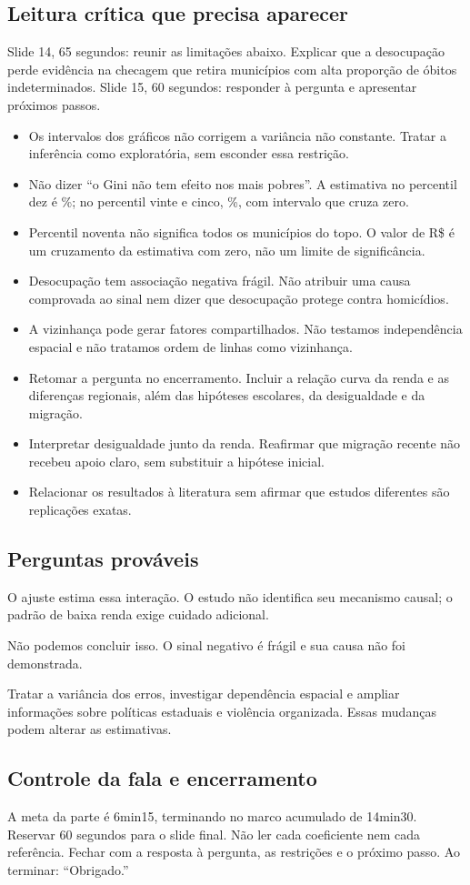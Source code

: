 \subsection{Leitura crítica que precisa aparecer}
Slide 14, 65 segundos: reunir as limitações abaixo. Explicar que a desocupação perde evidência na checagem que retira municípios com alta proporção de óbitos indeterminados. Slide 15, 60 segundos: responder à pergunta e apresentar próximos passos.
\begin{itemize}
\item Os intervalos dos gráficos não corrigem a variância não constante. Tratar a inferência como exploratória, sem esconder essa restrição.
\item Não dizer ``o Gini não tem efeito nos mais pobres''. A estimativa no percentil dez é \nGiniEfDez\%; no percentil vinte e cinco, \nGiniEfVinteCinco\%, com intervalo que cruza zero.
\item Percentil noventa não significa todos os municípios do topo. O valor de R\$ \nGiniZero{} é um cruzamento da estimativa com zero, não um limite de significância.
\item Desocupação tem associação negativa frágil. Não atribuir uma causa comprovada ao sinal nem dizer que desocupação protege contra homicídios.
\item A vizinhança pode gerar fatores compartilhados. Não testamos independência espacial e não tratamos ordem de linhas como vizinhança.
\item Retomar a pergunta no encerramento. Incluir a relação curva da renda e as diferenças regionais, além das hipóteses escolares, da desigualdade e da migração.
\item Interpretar desigualdade junto da renda. Reafirmar que migração recente não recebeu apoio claro, sem substituir a hipótese inicial.
\item Relacionar os resultados à literatura sem afirmar que estudos diferentes são replicações exatas.
\end{itemize}
\subsection{Perguntas prováveis}
\begin{description}[leftmargin=0pt]
\item[Por que o efeito do Gini muda com a renda?] O ajuste estima essa interação. O estudo não identifica seu mecanismo causal; o padrão de baixa renda exige cuidado adicional.
\item[A desocupação protege contra violência?] Não podemos concluir isso. O sinal negativo é frágil e sua causa não foi demonstrada.
\item[Qual é a principal melhoria futura?] Tratar a variância dos erros, investigar dependência espacial e ampliar informações sobre políticas estaduais e violência organizada. Essas mudanças podem alterar as estimativas.
\end{description}
\subsection{Controle da fala e encerramento}
A meta da parte é 6min15, terminando no marco acumulado de 14min30. Reservar 60 segundos para o slide final.
Não ler cada coeficiente nem cada referência. Fechar com a resposta à pergunta, as restrições e o próximo passo. Ao terminar: ``Obrigado.''

